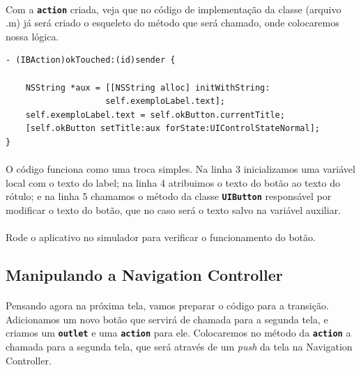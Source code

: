 \documentclass[a4paper,12pt,brazil,doubleside]{book}
\begin{document}
\paragraph{}Com a \texttt{\textbf{action}} criada, veja que no código de implementação da classe (arquivo .m) já será criado o esqueleto do método que será chamado, onde colocaremos nossa lógica.

\begin{listing}
\begin{verbatim}
- (IBAction)okTouched:(id)sender {
    
    NSString *aux = [[NSString alloc] initWithString:
                    self.exemploLabel.text];
    self.exemploLabel.text = self.okButton.currentTitle;
    [self.okButton setTitle:aux forState:UIControlStateNormal];
}
\end{verbatim}
\end{listing}

\paragraph{}O código funciona como uma troca simples. Na linha 3 inicializamos uma variável local com o texto do label; na linha 4 atribuimos o texto do botão ao texto do rótulo; e na linha 5 chamamos o método da classe \texttt{\textbf{UIButton}} responsável por modificar o texto do botão, que no caso será o texto salvo na variável auxiliar.
\paragraph{}Rode o aplicativo no simulador para verificar o funcionamento do botão.\\

\bigskip

\subsection{Manipulando a Navigation Controller}

\paragraph{}Pensando agora na próxima tela, vamos preparar o código para a transição. Adicionamos um novo botão que servirá de chamada para a segunda tela, e criamos um \texttt{\textbf{outlet}} e uma \texttt{\textbf{action}} para ele. Colocaremos no método da \texttt{\textbf{action}} a chamada para a segunda tela, que será através de um \emph{push} da tela na Navigation Controller.
\end{document}
